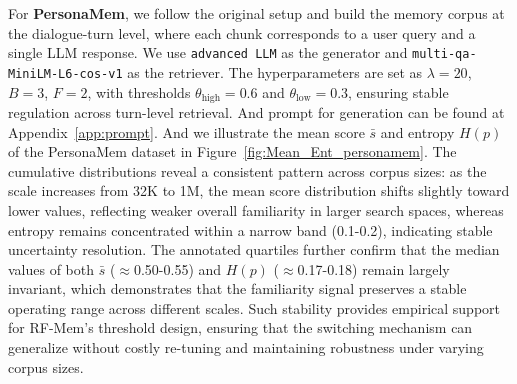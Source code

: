 For \textbf{PersonaMem}, we follow the original setup and build the memory corpus at the dialogue-turn level, where each chunk corresponds to a user query and a single LLM response. We use \texttt{advanced LLM} as the generator and \texttt{multi-qa-MiniLM-L6-cos-v1} as the retriever. The hyperparameters are set as $\lambda=20$, $B=3$, $F=2$, with thresholds $\theta_{\text{high}}=0.6$ and $\theta_{\text{low}}=0.3$, ensuring stable regulation across turn-level retrieval. 
And prompt for generation can be found at Appendix~\ref{app:prompt}. 
And we illustrate the mean score $\bar{s}$ and entropy $H(p)$ of the PersonaMem dataset in Figure~\ref{fig:Mean_Ent_personamem}. 
The cumulative distributions reveal a consistent pattern across corpus sizes: as the scale increases from 32K to 1M, the mean score distribution shifts slightly toward lower values, reflecting weaker overall familiarity in larger search spaces, whereas entropy remains concentrated within a narrow band (0.1-0.2), indicating stable uncertainty resolution. 
The annotated quartiles further confirm that the median values of both $\bar{s}$ ($\approx$0.50-0.55) and $H(p)$ ($\approx$0.17-0.18) remain largely invariant, which demonstrates that the familiarity signal preserves a stable operating range across different scales. 
Such stability provides empirical support for RF-Mem’s threshold design, ensuring that the switching mechanism can generalize without costly re-tuning and maintaining robustness under varying corpus sizes. 




